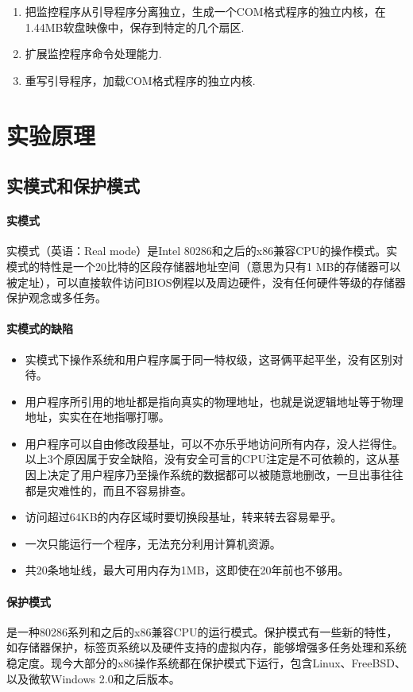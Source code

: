 \documentclass[a4paper, 11pt]{article} %
\begin{document}
\begin{enumerate}
  \item 把监控程序从引导程序分离独立，生成一个COM格式程序的独立内核，在1.44MB软盘映像中，保存到特定的几个扇区.
  \item 扩展监控程序命令处理能力.
  \item 重写引导程序，加载COM格式程序的独立内核.
\end{enumerate}

\section{实验原理}
\subsection{实模式和保护模式}

\paragraph{实模式}  \cite{wikirmode}
实模式（英语：Real mode）是Intel 80286和之后的x86兼容CPU的操作模式。实模式的特性是一个20比特的区段存储器地址空间（意思为只有1 MB的存储器可以被定址），可以直接软件访问BIOS例程以及周边硬件，没有任何硬件等级的存储器保护观念或多任务。

\paragraph{实模式的缺陷}\cite{realmodedownside}
\begin{itemize} 
  \item 实模式下操作系统和用户程序属于同一特权级，这哥俩平起平坐，没有区别对待。
  \item 用户程序所引用的地址都是指向真实的物理地址，也就是说逻辑地址等于物理地址，实实在在地指哪打哪。
  \item 用户程序可以自由修改段基址，可以不亦乐乎地访问所有内存，没人拦得住。
  以上3个原因属于安全缺陷，没有安全可言的CPU注定是不可依赖的，这从基因上决定了用户程序乃至操作系统的数据都可以被随意地删改，一旦出事往往都是灾难性的，而且不容易排查。
  \item 访问超过64KB的内存区域时要切换段基址，转来转去容易晕乎。
  \item 一次只能运行一个程序，无法充分利用计算机资源。
  \item 共20条地址线，最大可用内存为1MB，这即使在20年前也不够用。
\end{itemize}

\paragraph{保护模式}\cite{wikipmode}
是一种80286系列和之后的x86兼容CPU的运行模式。保护模式有一些新的特性，如存储器保护，标签页系统以及硬件支持的虚拟内存，能够增强多任务处理和系统稳定度。现今大部分的x86操作系统都在保护模式下运行，包含Linux、FreeBSD、以及微软Windows 2.0和之后版本。
\end{document}
